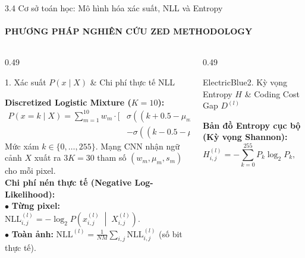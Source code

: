 \documentclass[aspectratio=169, 10pt, t]{beamer}
\begin{document}
\begin{frame}{3.4 Cơ sở toán học: Mô hình hóa xác suất, NLL và Entropy}
  \framesubtitle{PHƯƠNG PHÁP NGHIÊN CỨU \;\textbar\; ZED METHODOLOGY}
  \begin{columns}[T, totalwidth=\linewidth]
    \begin{column}{0.49\linewidth}
      \begin{cleanbox}[equal height group=s7math, top=0.8mm, bottom=0.8mm]{1. Xác suất $P(x \mid X)$ \& Chi phí thực tế NLL}
        \raggedright\scriptsize
        \textbf{Discretized Logistic Mixture ($K=10$):}\\
        {\tiny
        \begin{equation*}
          \begin{aligned}
            P(x = k \mid X) = \sum_{m=1}^{10} w_m \cdot \Big[ & \sigma\left((k + 0.5 - \mu_m)/s_m\right) \\
            & - \sigma\left((k - 0.5 - \mu_m)/s_m\right) \Big]
          \end{aligned}
        \end{equation*}}
        \vspace{-0.25em}
        Mức xám $k \in \{0, \dots, 255\}$. Mạng CNN nhận ngữ cảnh $X$ xuất ra $3K = 30$ tham số $(w_m, \mu_m, s_m)$ cho mỗi pixel.\\
        \vspace{0.12em}
        \textbf{Chi phí nén thực tế (Negative Log-Likelihood):}\\
        $\bullet$ \textbf{Từng pixel:} $\text{NLL}^{(l)}_{i,j} = -\log_2 P\left(x^{(l)}_{i,j} \;\middle|\; X^{(l)}_{i,j}\right)$.\\
        \vspace{0.04em}
        $\bullet$ \textbf{Toàn ảnh:} $\text{NLL}^{(l)} = \frac{1}{NM} \sum_{i,j} \text{NLL}^{(l)}_{i,j}$ (số bit thực tế).
      \end{cleanbox}
    \end{column}
    \begin{column}{0.49\linewidth}
      \begin{accentbox}[equal height group=s7math, top=0.8mm, bottom=0.8mm]{ElectricBlue}{2. Kỳ vọng Entropy $H$ \& Coding Cost Gap $D^{(l)}$}
        \raggedright\scriptsize
        \textbf{Bản đồ Entropy cục bộ (Kỳ vọng Shannon):}\\
        {\tiny
        \begin{equation*}
          H^{(l)}_{i,j} = -\sum_{k=0}^{255} P_k \log_2 P_k, \quad P_k = P\left(x^{(l)}_{i,j} = k \;\middle|\; X^{(l)}_{i,j}\right)

\end{equation*}}
\end{accentbox}
\end{column}
\end{columns}
\end{frame}
\end{document}
